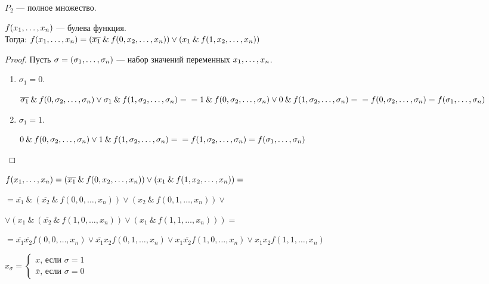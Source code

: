 \begin{example}
	$P_2$ --- полное множество.
\end{example}

\begin{statement}
	$f(x_1, \ldots, x_n)$ --- булева функция. \\Тогда: $f(x_1, \ldots, x_n) = (\overline{x_1} \: \& \: f(0, x_2, \ldots, x_n)) \vee (x_1 \: \& \: f(1, x_2, \ldots , x_n))$
\end{statement}
\begin{proof}
	Пусть $\sigma = (\sigma_1, \ldots, \sigma_n) $ --- набор значений переменных $x_1, \ldots, x_n$.
\begin{enumerate}
\item $\sigma_1 = 0$. 

$\overline{\sigma_1} \: \& \: f(0, \sigma_2, \ldots, \sigma_n) \vee \sigma_1 \: \& \: f(1, \sigma_2, \ldots, \sigma_n) =\\ = 1 \: \& \: f(0, \sigma_2, \ldots, \sigma_n) \vee 0 \: \& \: f(1, \sigma_2, \ldots, \sigma_n) =\\ = f(0, \sigma_2, \ldots, \sigma_n) = f(\sigma_1, \ldots, \sigma_n) $

\item $\sigma_1 = 1$.

$0 \: \& \: f(0, \sigma_2, \ldots, \sigma_n) \vee 1 \: \& \: f(1, \sigma_2, \ldots, \sigma_n) =\\ = f(1, \sigma_2, \ldots, \sigma_n) = f(\sigma_1, \ldots, \sigma_n) $
\end{enumerate}
\end{proof}

$
f(x_1, \ldots, x_n) = (\overline{x_1} \: \& \: f(0, x_2, \ldots, x_n)) \vee (x_1 \: \& \: f(1, x_2, \ldots , x_n)) = $

$= \overline{x_1} \: \& \: (\overline{x_2} \: \& \: f(0, 0, \ldots, x_n)) \vee (x_2 \: \& \: f(0, 1, \ldots , x_n)) \vee $

$ \vee (x_1 \: \& \: (\overline{x_2} \: \& \: f(1, 0, \ldots, x_n)) \vee (x_1 \: \& \: f(1, 1, \ldots , x_n))) =$

$
= \overline{x_1}\overline{x_2}f(0, 0, \ldots, x_n) \vee \overline{x_1} x_2 f(0, 1, \ldots, x_n) \vee x_1 \overline{x_2}f(1, 0, \ldots, x_n) \vee x_1 x_2 f(1, 1, \ldots, x_n)
$

\begin{df}
	$x_\sigma = \begin{cases} x \text{, если }\sigma = 1 \\ \overline{x} \text{, если }\sigma = 0 \end{cases}$
\end{df}


